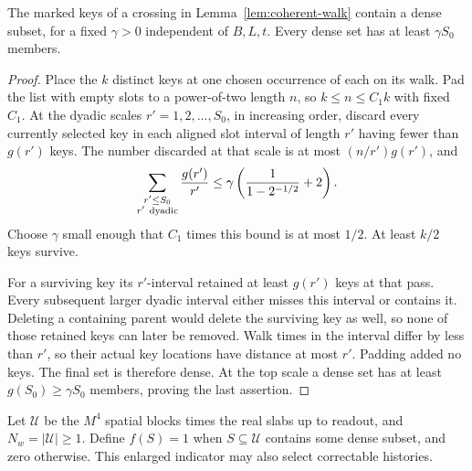 \begin{lemma}\label{lem:dense-extraction}
The marked keys of a crossing in Lemma~\ref{lem:coherent-walk}
contain a dense subset, for a fixed \(\gamma>0\) independent
of \(B,L,t\). Every dense set has at least \(\gamma S_0\)
members.
\end{lemma}
\begin{proof}
Place the \(k\) distinct keys at one chosen occurrence of each
on its walk. Pad the list with empty slots to a power-of-two
length \(n\), so \(k\le n\le C_1k\) with fixed \(C_1\).
At the dyadic scales \(r'=1,2,\ldots,S_0\), in increasing order,
discard every currently selected key in each aligned slot
interval of length \(r'\) having fewer than \(g(r')\) keys.
The number discarded at that scale is at most
\((n/r')g(r')\), and
\[
 \sum_{\substack{r'\le S_0\\r'\ {\rm dyadic}}}
                 \frac{g(r')}{r'}
 \le\gamma\left(\frac{1}{1-2^{-1/2}}+2\right).
\]
Choose \(\gamma\) small enough that \(C_1\) times this bound
is at most \(1/2\).
At least \(k/2\) keys survive.

For a surviving key its \(r'\)-interval retained at least
\(g(r')\) keys at that pass. Every subsequent larger dyadic
interval either misses this interval or contains it.
Deleting a containing parent would delete the surviving key
as well, so none of those retained keys can later be removed.
Walk times in the interval differ by less than \(r'\),
so their actual key locations have distance at most \(r'\).
Padding added no keys. The final set is therefore dense.
At the top scale a dense set has at least
\(g(S_0)\ge\gamma S_0\) members, proving the last assertion.
\end{proof}

Let \(\mathcal U\) be the \(M^4\) spatial blocks times the real
slabs up to readout, and \(N_w=|\mathcal U|\ge1\).
Define \(f(S)=1\) when \(S\subseteq\mathcal U\) contains
some dense subset, and zero otherwise. This enlarged
indicator may also select correctable histories.

